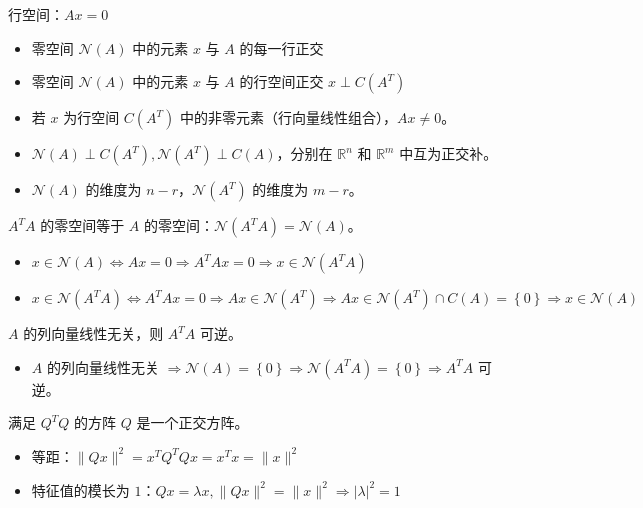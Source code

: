 \begin{remark}
    行空间：$Ax = 0$
    \begin{itemize}
        \item 零空间 $\mathcal{N}(A)$ 中的元素 $x$ 与 $A$ 的每一行正交
        \item 零空间 $\mathcal{N}(A)$ 中的元素 $x$ 与 $A$ 的行空间正交 $x \perp C(A^T)$
        \item 若 $x$ 为行空间 $C(A^T)$ 中的非零元素（行向量线性组合），$Ax \neq 0$。
        \item $\mathcal{N}(A) \perp C(A^T), \mathcal{N}(A^T) \perp C(A)$，分别在 $\mathbb{R}^n$ 和 $\mathbb{R}^m$ 中互为正交补。
        \item $\mathcal{N}(A)$ 的维度为 $n - r$，$\mathcal{N}(A^T)$ 的维度为 $m - r$。
    \end{itemize}
\end{remark}

\begin{remark}
	$A^TA$ 的零空间等于 $A$ 的零空间：$\mathcal{N}(A^TA) = \mathcal{N}(A)$。
	\begin{itemize}
		\item $x\in\mathcal{N}(A) \Leftrightarrow Ax=0 \Rightarrow A^TAx=0 \Rightarrow x \in \mathcal{N}(A^TA)$
		\item $x \in \mathcal{N}(A^TA)\Leftrightarrow A^TAx = 0 \Rightarrow Ax \in \mathcal{N}(A^T) \Rightarrow Ax \in \mathcal{N}(A^T)\cap C(A)=\left\{0\right\} \Rightarrow x\in \mathcal{N}(A)$
	\end{itemize}
\end{remark}

\begin{remark}
	$A$ 的列向量线性无关，则 $A^TA$ 可逆。
	\begin{itemize}
		\item $A$ 的列向量线性无关 $\Rightarrow \mathcal{N}(A) = \left\{0\right\}\Rightarrow \mathcal{N}(A^TA) = \left\{0\right\}\Rightarrow A^TA$ 可逆。
	\end{itemize}
\end{remark}

\begin{remark}
    满足 $Q^TQ$ 的方阵 $Q$ 是一个正交方阵。
    \begin{itemize}
        \item 等距：$\|Qx\|^2 = x^TQ^TQx = x^Tx = \|x\|^2$
        \item 特征值的模长为 $1$：$Qx = \lambda x, \|Qx\|^2 = \|x\|^2\Rightarrow |\lambda|^2 = 1$
    \end{itemize}
\end{remark}


